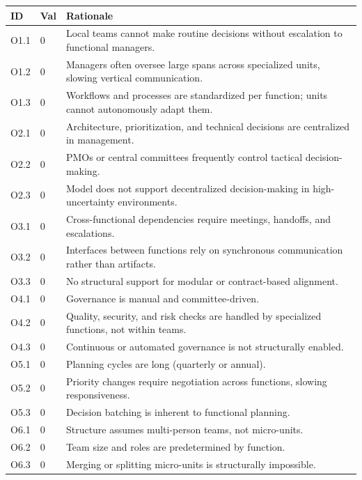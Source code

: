 \documentclass[11pt, a4paper, twocolumn]{article} %
\begin{document}
\begin{table}[h]
\centering
\begingroup\small
\setlength{\tabcolsep}{4pt}%
\begin{tabularx}{\linewidth}{llX}
\toprule
\textbf{ID} & \textbf{Val} & \textbf{Rationale} \\
\midrule
O1.1 & 0 &
Local teams cannot make routine decisions without escalation to functional managers. \\
O1.2 & 0 &
Managers often oversee large spans across specialized units, slowing vertical communication. \\
O1.3 & 0 &
Workflows and processes are standardized per function; units cannot autonomously adapt them. \\
\midrule
O2.1 & 0 &
Architecture, prioritization, and technical decisions are centralized in management. \\
O2.2 & 0 &
PMOs or central committees frequently control tactical decision-making. \\
O2.3 & 0 &
Model does not support decentralized decision-making in high-uncertainty environments. \\
\midrule
O3.1 & 0 &
Cross-functional dependencies require meetings, handoffs, and escalations. \\
O3.2 & 0 &
Interfaces between functions rely on synchronous communication rather than artifacts. \\
O3.3 & 0 &
No structural support for modular or contract-based alignment. \\
\midrule
O4.1 & 0 &
Governance is manual and committee-driven. \\
O4.2 & 0 &
Quality, security, and risk checks are handled by specialized functions, not within teams. \\
O4.3 & 0 &
Continuous or automated governance is not structurally enabled. \\
\midrule
O5.1 & 0 &
Planning cycles are long (quarterly or annual). \\
O5.2 & 0 &
Priority changes require negotiation across functions, slowing responsiveness. \\
O5.3 & 0 &
Decision batching is inherent to functional planning. \\
\midrule
O6.1 & 0 &
Structure assumes multi-person teams, not micro-units. \\
O6.2 & 0 &
Team size and roles are predetermined by function. \\
O6.3 & 0 &
Merging or splitting micro-units is structurally impossible. \\
\bottomrule
\end{tabularx}
\endgroup
\end{table}
\end{document}
